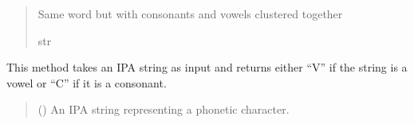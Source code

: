\documentclass[letterpaper,10pt,english]{sphinxmanual}
\begin{document}
\begin{fulllineitems}
\begin{fulllineitems}
\begin{quote}
\begin{description}
\sphinxAtStartPar
Same word but with consonants and vowels clustered together

\sphinxAtStartPar
str

\end{description}\end{quote}

\sphinxAtStartPar
{}

\begin{sphinxVerbatim}[commandchars=\\\{\}]
   
  
\PYG{p}{[}    \PYG{p}{]}
\end{sphinxVerbatim}

\end{fulllineitems}


\begin{fulllineitems}
\label{\detokenize{documentation:loanpy.utils.IPA.get_cv}}
\pysigstartsignatures
{}
\pysigstopsignatures
\sphinxAtStartPar
This method takes an IPA string as input and
returns either “V” if the string is a vowel or “C” if it is a
consonant.
\begin{quote}\begin{description}
\sphinxAtStartPar
{} () \textendash{} An IPA string representing a phonetic character.


\end{description}
\end{quote}
\end{fulllineitems}
\end{fulllineitems}
\end{document}
